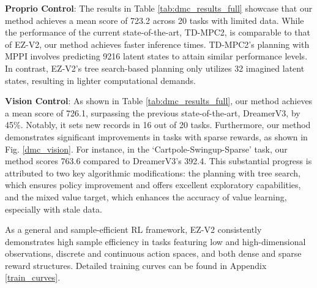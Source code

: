 

\textbf{Proprio Control}: 
The results in Table \ref{tab:dmc_results_full} showcase that our method achieves a mean score of 723.2 across 20 tasks with limited data. While the performance of the current state-of-the-art, TD-MPC2, is comparable to that of EZ-V2, our method achieves faster inference times. TD-MPC2's planning with MPPI involves predicting 9216 latent states to attain similar performance levels. In contrast, EZ-V2's tree search-based planning only utilizes 32 imagined latent states, resulting in lighter computational demands.



\textbf{Vision Control}:
As shown in Table \ref{tab:dmc_results_full}, our method achieves a mean score of 726.1, surpassing the previous state-of-the-art, DreamerV3, by 45\%. Notably, it sets new records in 16 out of 20 tasks. Furthermore, our method demonstrates significant improvements in tasks with sparse rewards, as shown in Fig. \ref{dmc_vision}. For instance, in the `Cartpole-Swingup-Sparse' task, our method scores 763.6 compared to DreamerV3's 392.4. This substantial progress is attributed to two key algorithmic modifications: the planning with tree search, which ensures policy improvement and offers excellent exploratory capabilities, and the mixed value target, which enhances the accuracy of value learning, especially with stale data.

As a general and sample-efficient RL framework, EZ-V2 consistently demonstrates high sample efficiency in tasks featuring low and high-dimensional observations, discrete and continuous action spaces, and both dense and sparse reward structures. Detailed training curves can be found in Appendix \ref{train_curves}.


